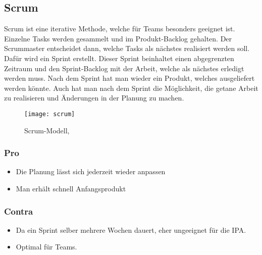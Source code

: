 \subsection{Scrum}
Scrum ist eine iterative Methode, welche für Teams besonders geeignet ist. Einzelne Tasks werden gesammelt und im Produkt-Backlog gehalten. Der Scrummaster entscheidet dann, welche Tasks als nächstes realisiert werden soll. Dafür wird ein Sprint erstellt. Dieser Sprint beinhaltet einen abgegrenzten Zeitraum und den Sprint-Backlog mit der Arbeit, welche als nächstes erledigt werden muss. Nach dem Sprint hat man wieder ein Produkt, welches ausgeliefert werden könnte. Auch hat man nach dem Sprint die Möglichkeit, die getane Arbeit zu realisieren und Änderungen in der Planung zu machen.
\begin{figure}[H]
	\centering
	\texttt{[image: scrum]}
	\caption{Scrum-Modell, \cite{web:scrumimage}}
\end{figure}
\subsubsection{Pro}
\begin{itemize}
\item Die Planung lässt sich jederzeit wieder anpassen
\item Man erhält schnell Anfangsprodukt
\end{itemize}
\subsubsection{Contra}
\begin{itemize}
\item Da ein Sprint selber mehrere Wochen dauert, eher ungeeignet für die IPA.
\item Optimal für Teams.
\end{itemize}

